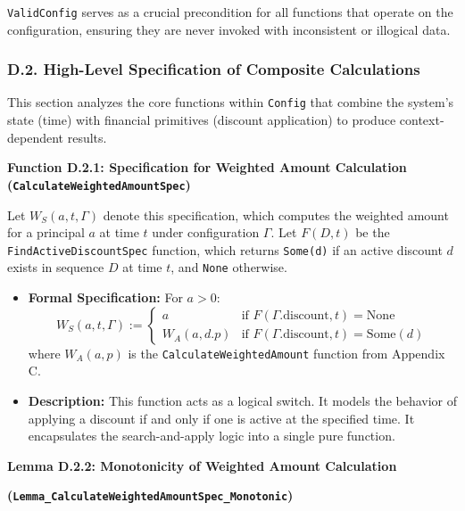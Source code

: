 \documentclass[
  english,
  onecolumn]{article}
\providecommand{\tightlist}{%
  \setlength{\itemsep}{0pt}\setlength{\parskip}{0pt}}
\begin{document}
\begin{itemize}
  \texttt{ValidConfig} serves as a crucial precondition for all
  functions that operate on the configuration, ensuring they are never
  invoked with inconsistent or illogical data.
\end{itemize}

\subsubsection{D.2. High-Level Specification of Composite
Calculations}\label{d.2.-high-level-specification-of-composite-calculations}

This section analyzes the core functions within \texttt{Config} that
combine the system's state (time) with financial primitives (discount
application) to produce context-dependent results.

\textbf{Function D.2.1: Specification for Weighted Amount Calculation
(\texttt{CalculateWeightedAmountSpec})}

Let \(W_S(a, t, \Gamma)\) denote this specification, which computes the
weighted amount for a principal \(a\) at time \(t\) under configuration
\(\Gamma\). Let \(F(D, t)\) be the \texttt{FindActiveDiscountSpec}
function, which returns \texttt{Some(d)} if an active discount \(d\)
exists in sequence \(D\) at time \(t\), and \texttt{None} otherwise.

\begin{itemize}
\tightlist
\item
  \textbf{Formal Specification:} For \(a > 0\): \[
  W_S(a, t, \Gamma) := \begin{cases}
  a & \text{if } F(\Gamma.\text{discount}, t) = \text{None} \\
  W_A(a, d.p) & \text{if } F(\Gamma.\text{discount}, t) = \text{Some}(d)
  \end{cases}
  \] where \(W_A(a, p)\) is the \texttt{CalculateWeightedAmount}
  function from Appendix C.
\item
  \textbf{Description:} This function acts as a logical switch. It
  models the behavior of applying a discount if and only if one is
  active at the specified time. It encapsulates the search-and-apply
  logic into a single pure function.
\end{itemize}

\textbf{Lemma D.2.2: Monotonicity of Weighted Amount Calculation}

\textbf{(\texttt{Lemma\_CalculateWeightedAmountSpec\_Monotonic})}
\end{document}
